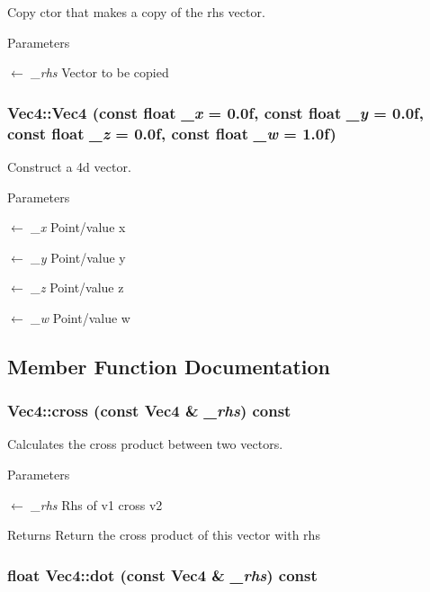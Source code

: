 Copy ctor that makes a copy of the rhs vector. 
\begin{DoxyParams}{Parameters}
\item[\mbox{$\leftarrow$} {\em \_\-rhs}]Vector to be copied \end{DoxyParams}
\hypertarget{classVec4_a72a49d139b8312f1eac661223fbdf08a}{
\subsubsection[{Vec4}]{\setlength{\rightskip}{0pt plus 5cm}Vec4::Vec4 (const float {\em \_\-x} = {\ttfamily 0.0f}, \/  const float {\em \_\-y} = {\ttfamily 0.0f}, \/  const float {\em \_\-z} = {\ttfamily 0.0f}, \/  const float {\em \_\-w} = {\ttfamily 1.0f})}}
\label{classVec4_a72a49d139b8312f1eac661223fbdf08a}


Construct a 4d vector. 
\begin{DoxyParams}{Parameters}
\item[\mbox{$\leftarrow$} {\em \_\-x}]Point/value x \item[\mbox{$\leftarrow$} {\em \_\-y}]Point/value y \item[\mbox{$\leftarrow$} {\em \_\-z}]Point/value z \item[\mbox{$\leftarrow$} {\em \_\-w}]Point/value w \end{DoxyParams}


\subsection{Member Function Documentation}
\hypertarget{classVec4_a5a2139b9f193e528e8f9bee0d0a14652}{
\subsubsection[{cross}]{ Vec4::cross (const {\bf Vec4} \& {\em \_\-rhs}) const}}
\label{classVec4_a5a2139b9f193e528e8f9bee0d0a14652}


Calculates the cross product between two vectors. 
\begin{DoxyParams}{Parameters}
\item[\mbox{$\leftarrow$} {\em \_\-rhs}]Rhs of v1 cross v2 \end{DoxyParams}
\begin{DoxyReturn}{Returns}
Return the cross product of this vector with rhs 
\end{DoxyReturn}
\hypertarget{classVec4_a91498b8d3af850201aababdeb523c58e}{
\subsubsection[{dot}]{\setlength{\rightskip}{0pt plus 5cm}float Vec4::dot (const {\bf Vec4} \& {\em \_\-rhs}) const}}
\label{classVec4_a91498b8d3af850201aababdeb523c58e}


